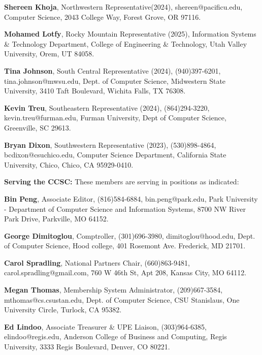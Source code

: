 \documentclass{article}
\begin{document}
\begin{multicols}{2}
\begin{raggedright}
{\noindent
\textbf{Shereen Khoja},	Northwestern Representative(2024), shereen@pacificu.edu,
Computer Science, 2043 College Way, Forest Grove, OR 97116.

\noindent
\textbf{Mohamed Lotfy}, Rocky Mountain Representative (2025), Information Systems \& Technology Department,
College of Engineering \& Technology, Utah Valley University, Orem, UT 84058.

\noindent
\textbf{Tina Johnson}, South Central Representative (2024), (940)397-6201,
tina.johnson@mwsu.edu, Dept. of Computer Science, Midwestern State University,
3410 Taft Boulevard, Wichita Falls, TX 76308.

\noindent
\textbf{Kevin Treu}, Southeastern Representative (2024), (864)294-3220,
kevin.treu@furman.edu, Furman University, Dept of Computer Science, Greenville,
SC 29613.

\noindent
\textbf{Bryan Dixon}, Southwestern Representative (2023), (530)898-4864,
bcdixon@csuchico.edu, Computer Science Department, California State University,
Chico, Chico, CA 95929-0410.

\vspace{0.2in}
\noindent
\textbf{Serving the CCSC:} These members are serving in positions as indicated:

\noindent
\textbf{Bin Peng}, Associate Editor, (816)584-6884,
bin.peng@park.edu, Park University - Department of Computer Science and
Information Systems, 8700 NW River Park Drive, Parkville, MO 64152.

\noindent
\textbf{George Dimitoglou}, Comptroller, (301)696-3980, dimitoglou@hood.edu,
Dept. of Computer Science, Hood college,
401 Rosemont Ave. Frederick, MD 21701.

\noindent
\textbf{Carol Spradling}, National Partners Chair,
(660)863-9481, carol.spradling@gmail.com, 760 W 46th St, Apt 208, Kansas City, MO 64112.

\noindent
\textbf{Megan Thomas}, Membership System Administrator, (209)667-3584,
mthomas@cs.csustan.edu, Dept. of Computer Science, CSU Stanislaus,
One University Circle, Turlock, CA 95382.

\noindent
\textbf{Ed Lindoo}, Associate Treasurer \& UPE Liaison, (303)964-6385, elindoo@regis.edu,
Anderson College of Business and Computing, Regis University, 3333 Regis Boulevard, Denver, CO 80221.

}

\end{raggedright}
\end{multicols}
\end{document}
